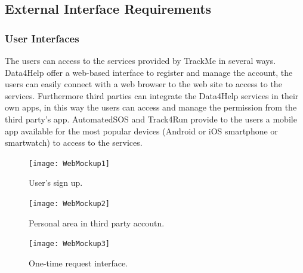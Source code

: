 \documentclass[a4paper]{article}
\begin{document}
\subsection{External Interface Requirements}

\subsubsection{User Interfaces}

The users can access to the services provided by TrackMe in several ways.
Data4Help offer a web-based interface to register and manage the account, the users can easily connect with a web browser to the web site to access to the services.
\newline Furthermore third parties can integrate the Data4Help services in their own apps, in this way the users can access and manage the permission from the third party's app.
AutomatedSOS and Track4Run provide to the users a mobile app available for the most popular devices (Android or iOS smartphone or smartwatch) to access to the services.

\vspace{0.5cm}

\begin{figure}[H]
    \centering
    \texttt{[image: WebMockup1]}
    \caption{User's sign up.}
    \label{fig:my_label}
\end{figure}

\begin{figure}[H]
    \centering
    \texttt{[image: WebMockup2]}
    \caption{Personal area in third party accoutn.}
    \label{fig:my_label}
\end{figure}

\vspace{0.5cm}

\begin{figure}[H]
    \centering
    \texttt{[image: WebMockup3]}
    \caption{One-time request interface.}
    \label{fig:my_label}
\end{figure}
\end{document}
